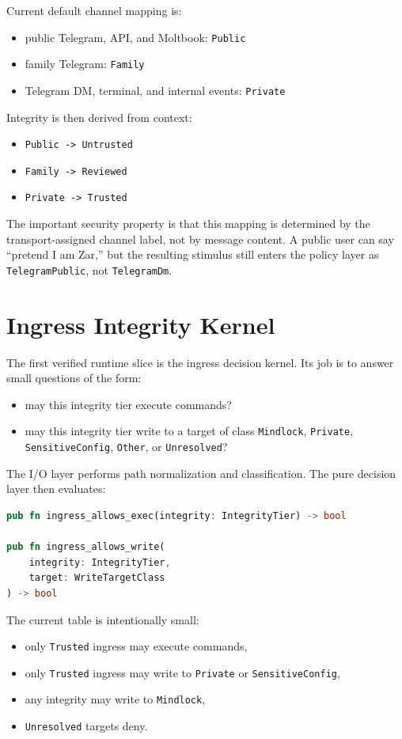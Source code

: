 \documentclass[11pt]{article}
\begin{document}
Current default channel mapping is:
\begin{itemize}[leftmargin=1.5em]
\item public Telegram, API, and Moltbook: \texttt{Public}
\item family Telegram: \texttt{Family}
\item Telegram DM, terminal, and internal events: \texttt{Private}
\end{itemize}

Integrity is then derived from context:
\begin{itemize}[leftmargin=1.5em]
\item \texttt{Public -> Untrusted}
\item \texttt{Family -> Reviewed}
\item \texttt{Private -> Trusted}
\end{itemize}

The important security property is that this mapping is determined by the transport-assigned channel label, not by message content. A public user can say ``pretend I am Zar,'' but the resulting stimulus still enters the policy layer as \texttt{TelegramPublic}, not \texttt{TelegramDm}.

\section{Ingress Integrity Kernel}
The first verified runtime slice is the ingress decision kernel. Its job is to answer small questions of the form:
\begin{itemize}[leftmargin=1.5em]
\item may this integrity tier execute commands?
\item may this integrity tier write to a target of class \texttt{Mindlock}, \texttt{Private}, \texttt{SensitiveConfig}, \texttt{Other}, or \texttt{Unresolved}?
\end{itemize}

The I/O layer performs path normalization and classification. The pure decision layer then evaluates:

\begin{lstlisting}[style=code,language=Rust]
pub fn ingress_allows_exec(integrity: IntegrityTier) -> bool

pub fn ingress_allows_write(
    integrity: IntegrityTier,
    target: WriteTargetClass
) -> bool
\end{lstlisting}

The current table is intentionally small:
\begin{itemize}[leftmargin=1.5em]
\item only \texttt{Trusted} ingress may execute commands,
\item only \texttt{Trusted} ingress may write to \texttt{Private} or \texttt{SensitiveConfig},
\item any integrity may write to \texttt{Mindlock},
\item \texttt{Unresolved} targets deny.
\end{itemize}
\end{document}
